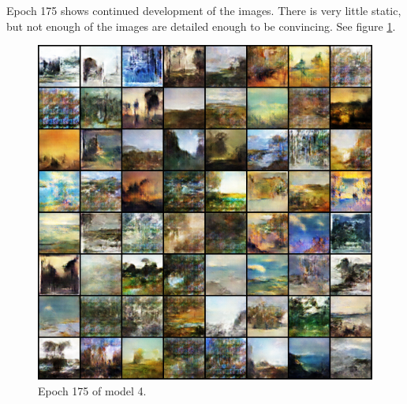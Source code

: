\documentclass[11pt,letterpaper]{article}
\begin{document}
				Epoch 175 shows continued development of the images.
				There is very little static, but not enough of the images are detailed enough to be convincing.
				See figure \ref{fig:wa64:epoch175generator}.
				\begin{figure}
					\centering
					\includegraphics[width=1.0\linewidth]{results/model4/epoch175_generator}
					\caption{Epoch 175 of model 4.}
					\label{fig:wa64:epoch175generator}
				\end{figure}
\end{document}
